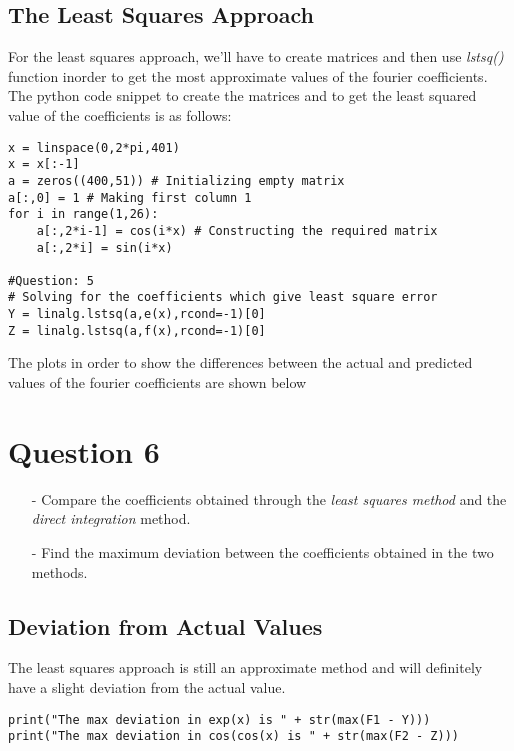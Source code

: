 \documentclass[11pt, a4paper, twoside]{article}
\begin{document}
\subsection{The Least Squares Approach}
For the least squares approach, we'll have to create matrices and then use \textit{lstsq()} function inorder to get the most approximate values of the fourier coefficients.\\
The python code snippet to create the matrices and to get the least squared value of the coefficients is as follows:
\begin{verbatim}	
x = linspace(0,2*pi,401) 
x = x[:-1]
a = zeros((400,51)) # Initializing empty matrix
a[:,0] = 1 # Making first column 1
for i in range(1,26):
    a[:,2*i-1] = cos(i*x) # Constructing the required matrix
    a[:,2*i] = sin(i*x)

#Question: 5
# Solving for the coefficients which give least square error
Y = linalg.lstsq(a,e(x),rcond=-1)[0] 
Z = linalg.lstsq(a,f(x),rcond=-1)[0]

\end{verbatim}
The plots in order to show the differences between the actual and predicted values of the fourier coefficients are shown below

\section{Question 6}
            \begin{itemize}
            \item[-] Compare the coefficients obtained through the \textit{least squares method} and the \textit{direct integration} method.
                \item[-] Find the maximum deviation between the coefficients obtained in the two methods.
            \end{itemize}

\subsection{Deviation from Actual Values} 
The least squares approach is still an approximate method and will definitely have a slight deviation from the actual value.

\begin{verbatim}
print("The max deviation in exp(x) is " + str(max(F1 - Y)))
print("The max deviation in cos(cos(x) is " + str(max(F2 - Z)))
\end{verbatim}
\end{document}
